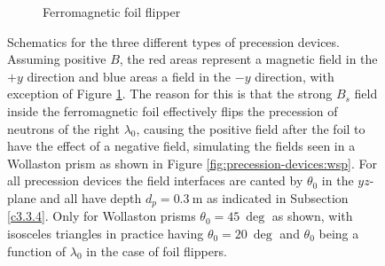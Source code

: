 \begin{figure}[htbp]
\begin{subfigure}[b]{0.3\textwidth}
		\caption{Ferromagnetic foil flipper}
		\label{fig:precession-devices:foil}
	\end{subfigure}
	\caption{Schematics for the three different types of precession devices. Assuming positive $B$, the red areas represent a magnetic field in the $+y$ direction and blue areas a field in the $-y$ direction, with exception of Figure \ref{fig:precession-devices:foil}. The reason for this is that the strong $B_s$ field inside the ferromagnetic foil effectively flips the precession of neutrons of the right $\lambda_0$, causing the positive field after the foil to have the effect of a negative field, simulating the fields seen in a Wollaston prism as shown in Figure \ref{fig:precession-devices:wsp}. For all precession devices the field interfaces are canted by $\theta_0$ in the $yz$-plane and all have depth $d_p = \SI{0.3}{\meter}$ as indicated in Subsection \ref{c3.3.4}. Only for Wollaston prisms $\theta_0 = \SI{45}{\deg}$ as shown, with isosceles triangles in practice having $\theta_0 = \SI{20}{\deg}$ and $\theta_0$ being a function of $\lambda_0$ in the case of foil flippers.}
	\label{fig:precession-devices}
\end{figure}

